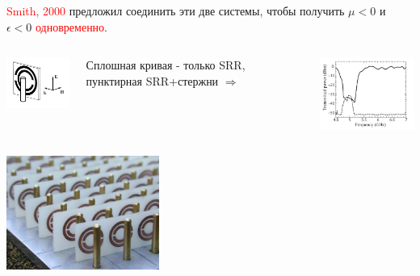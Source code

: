 \documentclass[9pt, compress, xcolor=table]{beamer}
\begin{document}
\begin{frame}{}

{\scriptsize \textcolor{red}{Smith, 2000} предложил соединить эти две системы, чтобы получить $\mu
< 0$ и $\epsilon < 0$ \textcolor{red}{одновременно}.
\begin{columns}[c]
\column{6cm}
\begin{center}
\includegraphics[width=3cm]{neg_ref_7}
\end{center}
{\tiny Сплошная кривая - только SRR, пунктирная SRR+стержни} $\Rightarrow$
\column{6cm}
\begin{center}
\includegraphics[width=4.5cm]{neg_ref_8}
\end{center}
\end{columns}
\begin{center}
\includegraphics[width=5cm]{neg_ref_21}
\end{center}
}
\end{frame}
\end{document}
